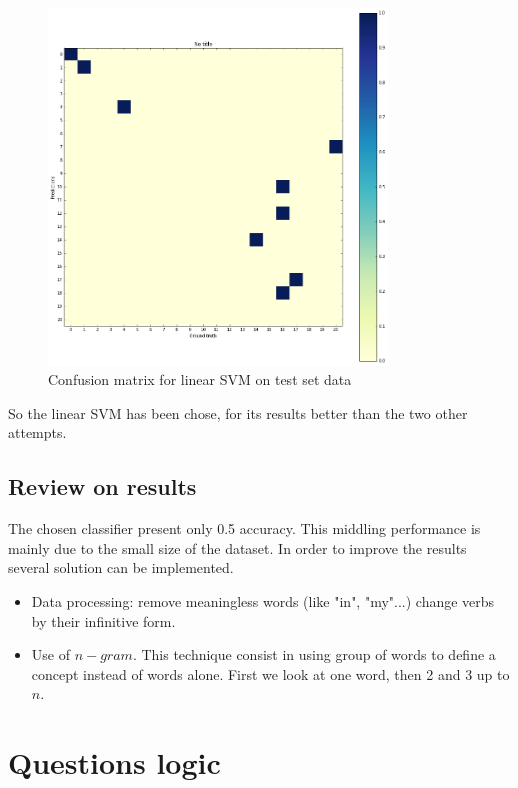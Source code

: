 \begin{figure}[H]
	\centering
	\includegraphics[width=9cm]{classifier_svm_linear_test}
	\caption{Confusion matrix for linear SVM on test set data}
	\label{svm_test}
\end{figure}

So the linear SVM has been chose, for its results better than the two other attempts. 

\subsection{Review on results}

The chosen classifier present only 0.5 accuracy. This middling performance is mainly due to the small size of the dataset. In order to improve the results several solution can be implemented.
\begin{itemize}
	\item Data processing: remove meaningless words (like "in", "my"...) change verbs by their infinitive form.
	\item Use of $n-gram$. This technique consist in using group of words to define a concept instead of words alone. First we look at one word, then 2 and 3 up to $n$.
\end{itemize}

\section{Questions logic}

